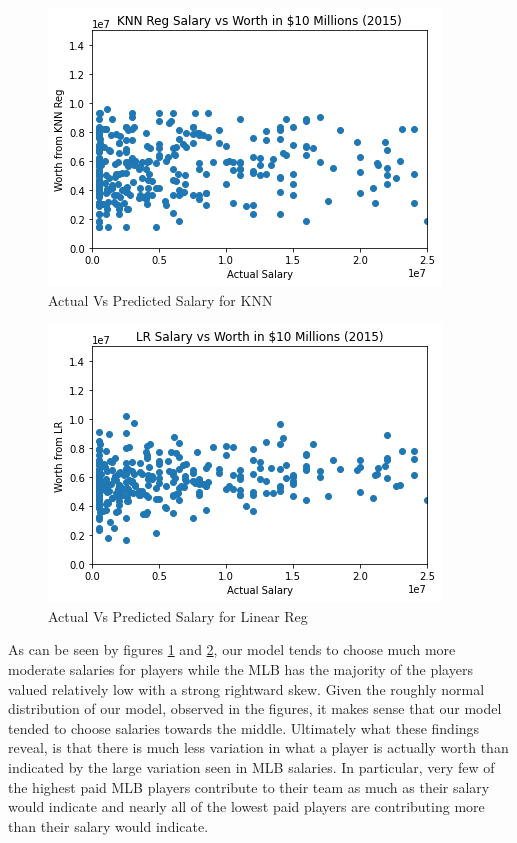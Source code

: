 \documentclass{article}
\begin{document}
        \begin{figure}[h!]
          \begin{center}
            \includegraphics[scale=.5]{knn_salary.png}
          \end{center}
          \caption{Actual Vs Predicted Salary for KNN}
          \label{fig:knn_sal}
        \end{figure}

        \begin{figure}[h!]
          \begin{center}
            \includegraphics[scale=.5]{lr_salary.png}
          \end{center}
          \caption{Actual Vs Predicted Salary for Linear Reg}
          \label{fig:lr_sal}
        \end{figure}


    As can be seen by figures \ref{fig:knn_sal} and \ref{fig:lr_sal}, our model tends to choose much more moderate salaries for players while the MLB has the majority of the players valued relatively low with a strong rightward skew. Given the roughly normal distribution of our model, observed in the figures, it makes sense that our model tended to choose salaries towards the middle. Ultimately what these findings reveal, is that there is much less variation in what a player is actually worth than indicated by the large variation seen in MLB salaries. In particular, very few of the highest paid MLB players contribute to their team as much as their salary would indicate and nearly all of the lowest paid players are contributing more than their salary would indicate. 
\end{document}
